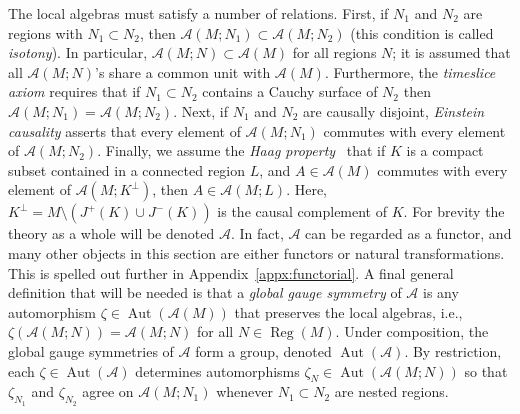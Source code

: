 \documentclass[sn-mathphys-num]{sn-jnl}%
\newcommand{\Af}{\mathscr{A}}
\DeclareMathOperator{\Aut}{Aut}
\DeclareMathOperator{\Reg}{Reg}
\numberwithin{equation}{section}
\theoremstyle{thmstyleone}%
\theoremstyle{thmstyletwo}%
\theoremstyle{thmstylethree}%
\begin{document}
The local algebras must satisfy a number of relations. First, if $N_1$ and $N_2$ are regions with $N_1\subset N_2$, then $\Af(M;N_1)\subset \Af(M;N_2)$ (this condition is called \emph{isotony}). In particular, $\Af(M;N)\subset \Af(M)$ for all regions $N$; it is assumed that all $\Af(M;N)$'s share a common unit with $\Af(M)$. Furthermore, the \emph{timeslice axiom} requires that if $N_1\subset N_2$ contains a Cauchy surface of $N_2$ then $\Af(M;N_1)=\Af(M;N_2)$. Next, if $N_1$ and $N_2$ are causally disjoint, \emph{Einstein causality} asserts that every element of $\Af(M;N_1)$ commutes with every element of $\Af(M;N_2)$. Finally, we assume the \emph{Haag property}~\cite{FewVer_QFLM:2018} that if $K$ is a compact subset contained in a connected region $L$, and  $A\in \Af(M)$ commutes with every element of $\Af(M;K^\perp)$, then $A\in \Af(M;L)$. Here, $K^\perp=M\setminus (J^+(K)\cup J^-(K))$ is the causal complement of $K$. For brevity the theory as a whole will be denoted $\Af$. In fact, $\Af$ can be regarded as a functor, and
many other objects in this section are either functors or natural transformations. This is spelled out further in Appendix~\ref{appx:functorial}. A final general definition that will be needed is that a \emph{global gauge symmetry} 
of $\Af$ is any automorphism $\zeta\in\Aut(\Af(M))$ that preserves the local algebras, i.e., $\zeta(\Af(M;N))=\Af(M;N)$ for all $N\in\Reg(M)$. Under composition, the global gauge symmetries of $\Af$ form a group, denoted $\Aut(\Af)$. By restriction, each $\zeta\in\Aut(\Af)$ determines automorphisms $\zeta_N\in\Aut(\Af(M;N))$ so that $\zeta_{N_1}$ and
$\zeta_{N_2}$ agree on $\Af(M;N_1)$ whenever $N_1\subset N_2$ are nested regions.
 
\end{document}

